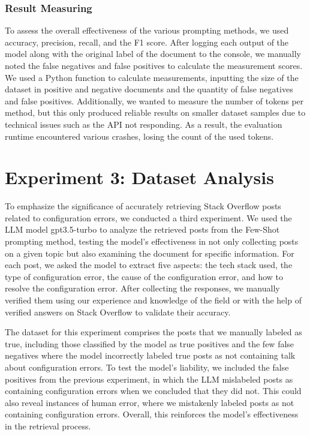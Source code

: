 \documentclass[english,bachelor]{swsLeipzig}
\begin{document}
\subsubsection{Result Measuring}
To assess the overall effectiveness of the various prompting methods, we used accuracy, precision, recall, and the F1 score. After logging each output of the model along with the original label of the document to the console, we manually noted the false negatives and false positives to calculate the measurement scores. We used a Python function to calculate measurements, inputting the size of the dataset in positive and negative documents and the quantity of false negatives and false positives. Additionally, we wanted to measure the number of tokens per method, but this only produced reliable results on smaller dataset samples due to technical issues such as the API not responding. As a result, the evaluation runtime encountered various crashes, losing the count of the used tokens.

\section{Experiment 3: Dataset Analysis}

To emphasize the significance of accurately retrieving Stack Overflow posts related to configuration 
errors, we conducted a third experiment. We used the LLM model gpt3.5-turbo to analyze the retrieved posts from the Few-Shot prompting method, testing the model's effectiveness in not only collecting posts on a given topic but also examining the document for specific information. For each post, we asked the model to extract five aspects: the tech stack used, the type of configuration error, the cause of the configuration error, and how to resolve the configuration error. After collecting the responses, we manually verified them using our experience and knowledge of the field or with the help of verified answers on Stack Overflow to validate their accuracy.

The dataset for this experiment comprises the posts that we manually labeled as true, including those 
classified by the model as true positives and the few false negatives where the model incorrectly labeled true posts as not containing talk about configuration errors. To test the model's liability, we included the false positives from the previous experiment, in which the LLM mislabeled posts as containing configuration errors when we concluded that they did not. This could also reveal instances of human error, where we mistakenly labeled posts as not containing configuration errors. Overall, this reinforces the model's effectiveness in the retrieval process.
\end{document}
